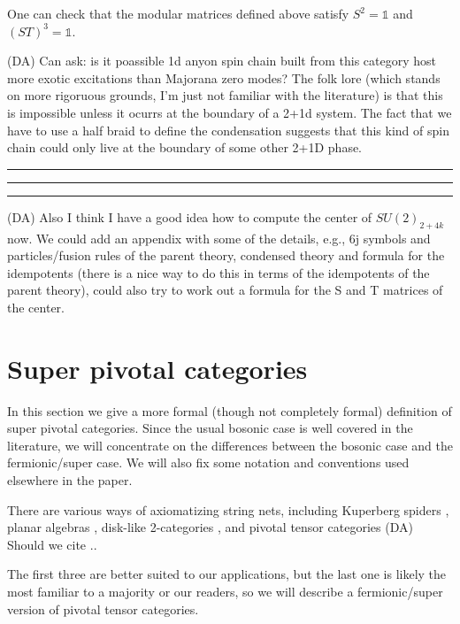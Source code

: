 \documentclass[12pt,a4paper]{article}
\newcommand{\unit}{\mathds{1}}
\newcommand{\kwsep}{\bigskip\hrule\medskip\hrule\medskip\hrule\bigskip}
\newcommand{\dave}[1]{{\color{ao(english)}\footnotesize{(DA) #1}}}
\begin{document}
One can check that the modular matrices defined above satisfy $S^2 =\unit$ and $(ST)^3 = \unit$. 


\dave{ 
Can ask: is it poassible 1d anyon spin chain built from this category host more exotic excitations than Majorana zero modes? 
The folk lore (which stands on more rigoruous grounds, I'm just not familiar with the literature) is that this is impossible unless it ocurrs at the boundary of a 2+1d system.
The fact that we have to use a half braid to define the condensation suggests that this kind of spin chain could only live at the boundary of some other 2+1D phase.
}



\kwsep


\dave{Also I think I have a good idea how to compute the center of $SU(2)_{2+4k}$ now. 
We could add an appendix with some of the details, e.g., 6j symbols and particles/fusion rules of the parent theory, condensed theory and formula for the idempotents (there is a nice way to do this in terms of the idempotents of the parent theory), could also try to work out a formula for the S and T matrices of the center.}







\section{Super pivotal categories}  \label{def_sect}

In this section we give a more formal (though not completely formal) definition of super pivotal categories.
Since the usual bosonic case is well covered in the literature, we will concentrate on
the differences between the bosonic case and the fermionic/super case.
We will also fix some notation and conventions used elsewhere in the paper.


There are various ways of axiomatizing string nets, including Kuperberg spiders \cite{kup_spider}, 
planar algebras \cite{jones_pa},
disk-like 2-categories \cite{blob_paper}, and pivotal tensor categories \cite{kitaev2006}
\dave{Should we cite \cite{Barrett1999}.}.

The first three are better suited to our applications, but the last one is likely the most familiar to a majority or our readers,
so we will describe a fermionic/super version of pivotal tensor categories.
\end{document}
